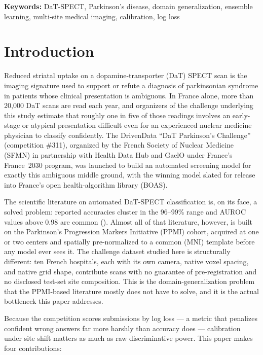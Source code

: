 \documentclass[11pt]{article}
\begin{document}
\noindent\textbf{Keywords:} DaT-SPECT, Parkinson's disease, domain generalization, ensemble learning, multi-site medical imaging, calibration, log loss

\section{Introduction}
\label{sec:intro}

Reduced striatal uptake on a dopamine-transporter (DaT) SPECT scan is the imaging signature used to support or refute a diagnosis of parkinsonian syndrome in patients whose clinical presentation is ambiguous. In France alone, more than 20{,}000 DaT scans are read each year, and organizers of the challenge underlying this study estimate that roughly one in five of those readings involves an early-stage or atypical presentation difficult even for an experienced nuclear medicine physician to classify confidently. The DrivenData ``DaT Parkinson's Challenge'' (competition \#311), organized by the French Society of Nuclear Medicine (SFMN) in partnership with Health Data Hub and GaelO under France's France~2030 program, was launched to build an automated screening model for exactly this ambiguous middle ground, with the winning model slated for release into France's open health-algorithm library (BOAS).

The scientific literature on automated DaT-SPECT classification is, on its face, a solved problem: reported accuracies cluster in the 96--99\% range and AUROC values above 0.98 are common (). Almost all of that literature, however, is built on the Parkinson's Progression Markers Initiative (PPMI) cohort, acquired at one or two centers and spatially pre-normalized to a common (MNI) template before any model ever sees it. The challenge dataset studied here is structurally different: ten French hospitals, each with its own camera, native voxel spacing, and native grid shape, contribute scans with no guarantee of pre-registration and no disclosed test-set site composition. This is the domain-generalization problem that the PPMI-based literature mostly does not have to solve, and it is the actual bottleneck this paper addresses.

Because the competition scores submissions by log loss --- a metric that penalizes confident wrong answers far more harshly than accuracy does --- calibration under site shift matters as much as raw discriminative power. This paper makes four contributions:
\end{document}
